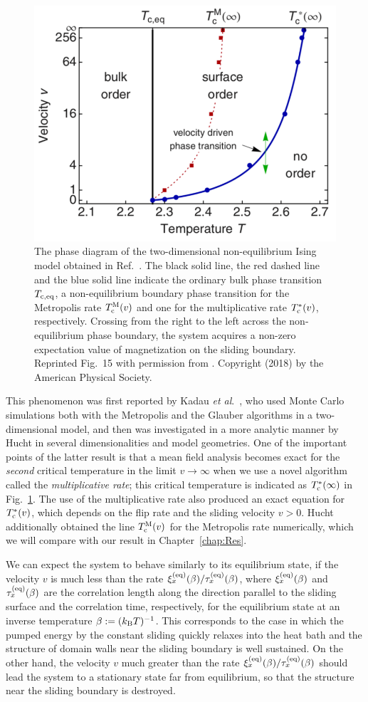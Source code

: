 \begin{figure}[htbp]
\centering
\includegraphics[width=0.5\linewidth]{Fig15.pdf}
\caption{The phase diagram of the two-dimensional non-equilibrium Ising model obtained in Ref.~\cite{Hucht2009b}. The black solid line, the red dashed line and the blue solid line indicate the ordinary bulk phase transition $T_{\rm c,eq}$, a non-equilibrium boundary phase transition for the Metropolis rate $T_{\rm c}^{\rm M}(v)$ and one for the multiplicative rate $T_{\rm c}^{*}(v)$, respectively. Crossing from the right to the left across the non-equilibrium phase boundary, the system acquires a non-zero expectation value of magnetization on the sliding boundary. Reprinted Fig.~15 with permission from . Copyright (2018) by the American Physical Society.}
\label{fig:NEPTinIsing}
\end{figure}

This phenomenon was first reported by Kadau \textit{et al}.\ \cite{Kadau2008}, who used Monte Carlo simulations both with the Metropolis and the Glauber algorithms in a two-dimensional model, and then was investigated in a more analytic manner by Hucht \cite{Hucht2009b} in several dimensionalities and model geometries. One of the important points of the latter result is that a mean field analysis becomes exact for the \textit{second} critical temperature in the limit $v\to \infty$ when we use a novel algorithm called the \textit{multiplicative rate}; this critical temperature is indicated as $T^{*}_{\rm c}(\infty)$ in Fig.~\ref{fig:NEPTinIsing}. The use of the multiplicative rate also produced an exact equation for $T^{*}_{\rm c}(v)$, which depends on the flip rate and the sliding velocity $v>0$. Hucht additionally obtained the line $T_{\rm c}^{\rm M}(v)$ for the Metropolis rate numerically, which we will compare with our result in Chapter~\ref{chap:Res}.

We can expect the system to behave similarly to its equilibrium state, if the velocity $v$ is much less than the rate $\xi^{(\rm eq)}_{x}(\beta)/\tau^{(\rm eq)}_{x}(\beta)$, where $\xi^{(\rm eq)}_{x}(\beta)$ and $\tau^{(\rm eq)}_{x}(\beta)$ are the correlation length along the direction parallel to the sliding surface and the correlation time, respectively, for the equilibrium state at an inverse temperature $\beta:=(k_{\rm B}T)^{-1}$. This corresponds to the case in which the pumped energy by the constant sliding quickly relaxes into the heat bath and the structure of domain walls near the sliding boundary is well sustained. On the other hand, the velocity $v$ much greater than the rate $\xi^{(\rm eq)}_{x}(\beta)/\tau^{(\rm eq)}_{x}(\beta)$ should lead the system to a stationary state far from equilibrium, so that the structure near the sliding boundary is destroyed. 

